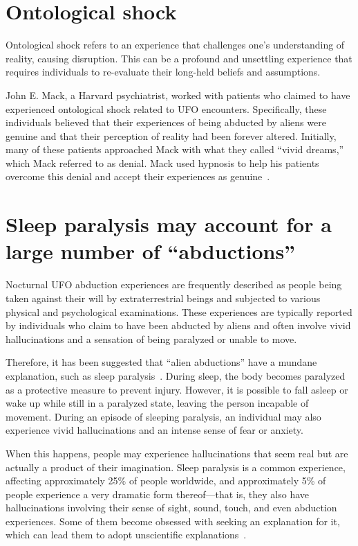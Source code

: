 \section{Ontological shock}
\label{2023-UFO-part-Perception-abductions-Ontologicalshock}

Ontological shock refers to an experience that challenges one's understanding of reality, causing disruption. This can be a profound and unsettling experience that requires individuals to re-evaluate their long-held beliefs and assumptions.

John E. Mack, a Harvard psychiatrist, worked with patients who claimed to have experienced ontological shock related to UFO encounters. Specifically, these individuals believed that their experiences of being abducted by aliens were genuine and that their perception of reality had been forever altered. Initially, many of these patients approached Mack with what they called ``vivid dreams,'' which Mack referred to as denial. Mack used hypnosis to help his patients overcome this denial and accept their experiences as genuine~\cite{Mack1994Apr,Mack-NYT1994Mar}.


\section{Sleep paralysis may account for a large number of ``abductions''}

Nocturnal UFO abduction experiences are frequently described as people being taken against their will by extraterrestrial beings and subjected to various physical and psychological examinations. These experiences are typically reported by individuals who claim to have been abducted by aliens and often involve vivid hallucinations and a sensation of being paralyzed or unable to move.

Therefore, it has been suggested that ``alien abductions'' have a mundane explanation, such as sleep paralysis~\cite{Holden_2002,Clancy2007Apr}. During sleep, the body becomes paralyzed as a protective measure to prevent injury. However, it is possible to fall asleep or wake up while still in a paralyzed state, leaving the person incapable of movement. During an episode of sleeping paralysis, an individual may also experience vivid hallucinations and an intense sense of fear or anxiety.

When this happens, people may experience hallucinations that seem real but are actually a product of their imagination. Sleep paralysis is a common experience, affecting approximately 25{\%}
of people worldwide, and approximately 5{\%}
of people experience a very dramatic form thereof---that is, they also have hallucinations involving their sense of sight, sound, touch, and even abduction experiences. Some of them become obsessed with seeking an explanation for it, which can lead them to adopt unscientific explanations~\cite{Spanos_1993}.

